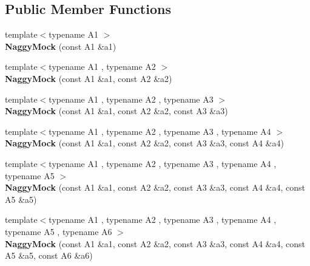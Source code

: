\subsection*{Public Member Functions}
\begin{DoxyCompactItemize}
\item 
\mbox{\label{classtesting_1_1_naggy_mock_ae43ea6c6a6b66fe31cb14f93e0be5718}} 
{\footnotesize template$<$typename A1 $>$ }\\{\bfseries Naggy\+Mock} (const A1 \&a1)
\item 
\mbox{\label{classtesting_1_1_naggy_mock_a4241363ab2ca3a2e7baa5ead980175e6}} 
{\footnotesize template$<$typename A1 , typename A2 $>$ }\\{\bfseries Naggy\+Mock} (const A1 \&a1, const A2 \&a2)
\item 
\mbox{\label{classtesting_1_1_naggy_mock_abd9eea0573bf39f4b41504b2d1df5311}} 
{\footnotesize template$<$typename A1 , typename A2 , typename A3 $>$ }\\{\bfseries Naggy\+Mock} (const A1 \&a1, const A2 \&a2, const A3 \&a3)
\item 
\mbox{\label{classtesting_1_1_naggy_mock_aa7d63f62600171db931c6bbb4c2a6d52}} 
{\footnotesize template$<$typename A1 , typename A2 , typename A3 , typename A4 $>$ }\\{\bfseries Naggy\+Mock} (const A1 \&a1, const A2 \&a2, const A3 \&a3, const A4 \&a4)
\item 
\mbox{\label{classtesting_1_1_naggy_mock_ac751c8a708935bd8558c9665160f7144}} 
{\footnotesize template$<$typename A1 , typename A2 , typename A3 , typename A4 , typename A5 $>$ }\\{\bfseries Naggy\+Mock} (const A1 \&a1, const A2 \&a2, const A3 \&a3, const A4 \&a4, const A5 \&a5)
\item 
\mbox{\label{classtesting_1_1_naggy_mock_aac4c0986e917a5d6e515f8dc0e7bf644}} 
{\footnotesize template$<$typename A1 , typename A2 , typename A3 , typename A4 , typename A5 , typename A6 $>$ }\\{\bfseries Naggy\+Mock} (const A1 \&a1, const A2 \&a2, const A3 \&a3, const A4 \&a4, const A5 \&a5, const A6 \&a6)

\end{DoxyCompactItemize}
